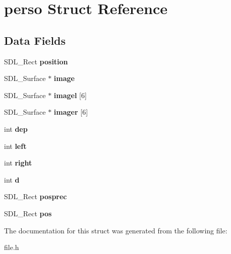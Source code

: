 \hypertarget{structperso}{}\section{perso Struct Reference}
\label{structperso}
\subsection*{Data Fields}
\begin{DoxyCompactItemize}
\item 
\mbox{\label{structperso_a74aed265eb926987cf218b19d163c746}} 
S\+D\+L\+\_\+\+Rect {\bfseries position}
\item 
\mbox{\label{structperso_a3bb43b8e820b3ba348b6c96458b39231}} 
S\+D\+L\+\_\+\+Surface $\ast$ {\bfseries image}
\item 
\mbox{\label{structperso_a9e4c9b799147e2489f96bab94394512c}} 
S\+D\+L\+\_\+\+Surface $\ast$ {\bfseries imagel} \mbox{[}6\mbox{]}
\item 
\mbox{\label{structperso_a5c60840893923fff25a35cfdd4731669}} 
S\+D\+L\+\_\+\+Surface $\ast$ {\bfseries imager} \mbox{[}6\mbox{]}
\item 
\mbox{\label{structperso_a92006ed200b3dd04d02af5957bd4f910}} 
int {\bfseries dep}
\item 
\mbox{\label{structperso_a09b35ffe6af078416f3f9400963764b1}} 
int {\bfseries left}
\item 
\mbox{\label{structperso_a659a8d5f2ffd70918846dd53fd14c04f}} 
int {\bfseries right}
\item 
\mbox{\label{structperso_ab5fac0d182cb7cc25d2d26283c0417bf}} 
int {\bfseries d}
\item 
\mbox{\label{structperso_a9671a85d13daa12924ee28d4d31e1a29}} 
S\+D\+L\+\_\+\+Rect {\bfseries posprec}
\item 
\mbox{\label{structperso_a1702962d93240085dc2dfab4c0d7754f}} 
S\+D\+L\+\_\+\+Rect {\bfseries pos}
\end{DoxyCompactItemize}


The documentation for this struct was generated from the following file\+:\begin{DoxyCompactItemize}
\item 
file.\+h\end{DoxyCompactItemize}
